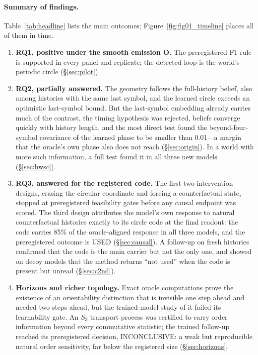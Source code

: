 \documentclass[11pt,a4paper]{article}
\DeclareRobustCommand{\_}{\ifmmode\origunderscore\else\textunderscore\allowbreak\fi}
\begin{document}
\paragraph{Summary of findings.} Table~\ref{tab:headline} lists the main outcomes;
Figure~\ref{fig:fig01_timeline} places all of them in time.
\begin{enumerate}
\item \textbf{RQ1, positive under the smooth emission O.} The preregistered F1 rule is supported
in every panel and replicate; the detected loop is the world's periodic circle (\S\ref{sec:pilot}).
\item \textbf{RQ2, partially answered.} The geometry follows the full-history belief, also among
histories with the same last symbol, and the learned circle exceeds an optimistic last-symbol
bound. But the last-symbol embedding already carries much of the contrast, the timing
hypothesis was rejected, beliefs converge quickly with history length, and the most direct
test found the beyond-four-symbol covariance of the learned phase to be smaller than
0.01---a margin that the oracle's own phase also does not reach (\S\ref{sec:origin}). In a world
with more such information, a full test found it in all three new models (\S\ref{sec:hwsc}).
\item \textbf{RQ3, answered for the registered code.} The first two intervention designs,
erasing the circular coordinate and forcing a counterfactual state, stopped at preregistered
feasibility gates before any causal endpoint was scored. The third design attributes the
model's own response to natural counterfactual histories exactly to its circle code at the
final readout: the code carries 85\% of the oracle-aligned response in all three models, and
the preregistered outcome is USED (\S\ref{sec:causal}). A follow-up on fresh histories confirmed
that the code is the main carrier but not the only one, and showed on decoy models that the
method returns ``not used'' when the code is present but unread (\S\ref{sec:c2nd}).
\item \textbf{Horizons and richer topology.} Exact oracle computations prove the existence of an
orientability distinction that is invisible one step ahead and needed two steps ahead, but the
trained-model study of it failed its learnability gate. An $S_3$ transport process was
certified to carry order information beyond every commutative statistic; the
trained follow-up reached its preregistered decision, INCONCLUSIVE: a weak but
reproducible natural order sensitivity, far below the registered size (\S\ref{sec:horizons},

\end{enumerate}
\end{document}
